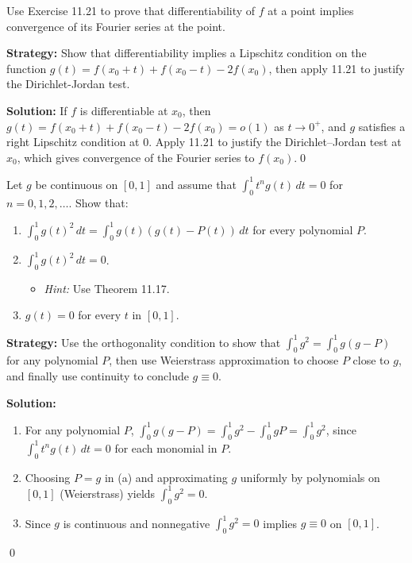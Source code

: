 \begin{problembox}
\begin{problemstatement}
Use Exercise 11.21 to prove that differentiability of $f$ at a point implies convergence of its Fourier series at the point.
\end{problemstatement}
\end{problembox}

\noindent\textbf{Strategy:} Show that differentiability implies a Lipschitz condition on the function $g(t)=f(x_0+t)+f(x_0-t)-2f(x_0)$, then apply 11.21 to justify the Dirichlet-Jordan test.

\bigskip\noindent\textbf{Solution:}
If $f$ is differentiable at $x_0$, then $g(t)=f(x_0+t)+f(x_0-t)-2f(x_0)=o(1)$ as $t\to0^+$, and $g$ satisfies a right Lipschitz condition at $0$. Apply 11.21 to justify the Dirichlet–Jordan test at $x_0$, which gives convergence of the Fourier series to $f(x_0)$.\qed


\begin{problembox}
\begin{problemstatement}
Let $g$ be continuous on $[0, 1]$ and assume that $\int_0^1 t^n g(t) \, dt = 0$ for $n = 0, 1, 2, \dots$. Show that:
\begin{enumerate}[label=(\alph*)]
\item $\int_0^1 g(t)^2 \, dt = \int_0^1 g(t)(g(t) - P(t)) \, dt$ for every polynomial $P$.
\item $\int_0^1 g(t)^2 \, dt = 0$.
\begin{itemize}
\item \textit{Hint:} Use Theorem 11.17.
\end{itemize}
\item $g(t) = 0$ for every $t$ in $[0, 1]$.
\end{enumerate}
\end{problemstatement}
\end{problembox}

\noindent\textbf{Strategy:} Use the orthogonality condition to show that $\int_0^1 g^2 = \int_0^1 g(g-P)$ for any polynomial $P$, then use Weierstrass approximation to choose $P$ close to $g$, and finally use continuity to conclude $g\equiv0$.

\bigskip\noindent\textbf{Solution:}
\begin{enumerate}[label=(\alph*)]
\item For any polynomial $P$, $\int_0^1 g(g-P)=\int_0^1 g^2-\int_0^1 gP=\int_0^1 g^2$, since $\int_0^1 t^n g(t)\,dt=0$ for each monomial in $P$.
\item Choosing $P=g$ in (a) and approximating $g$ uniformly by polynomials on $[0,1]$ (Weierstrass) yields $\int_0^1 g^2=0$.
\item Since $g$ is continuous and nonnegative $\int_0^1 g^2=0$ implies $g\equiv0$ on $[0,1]$.
\end{enumerate}\qed


